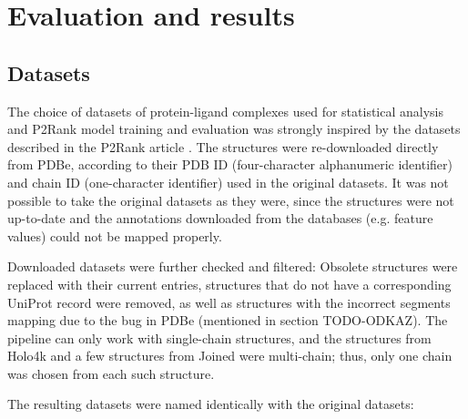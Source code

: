 \chapter{Evaluation and results}


\section{Datasets}


The choice of datasets of protein-ligand complexes used for statistical analysis and P2Rank model training and evaluation was strongly inspired by the datasets described in the P2Rank article \cite{p2rank1}. The structures were re-downloaded directly from PDBe, according to their PDB ID (four-character alphanumeric identifier) and chain ID (one-character identifier) used in the original datasets. It was not possible to take the original datasets as they were, since the structures were not up-to-date and the annotations downloaded from the databases (e.g. feature values) could not be mapped properly.

Downloaded datasets were further checked and filtered: Obsolete structures were replaced with their current entries, structures that do not have a corresponding UniProt record were removed, as well as  structures with the incorrect segments mapping due to the bug in PDBe (mentioned in section TODO-ODKAZ). The pipeline can only work with single-chain structures, and the structures from Holo4k and a few structures from Joined were multi-chain; thus, only one chain was chosen from each such structure.


The resulting datasets were named identically with the original datasets:

